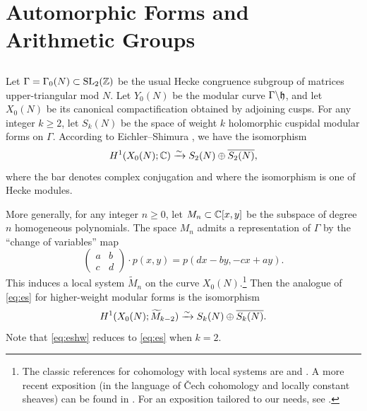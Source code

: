 \section{Automorphic Forms and Arithmetic Groups}\label{aut.forms}
%
\subsection{}
%
Let $\Gamma = \Gamma_{0} (N)\subset \operatorname{SL}_{2} (\mathbb{Z})$ be the usual Hecke
congruence subgroup of matrices upper-triangular mod $N$. Let
$Y_{0} (N)$ be the modular curve $\Gamma \backslash \mathfrak h$, and let
$X_{0} (N)$ be its canonical compactification obtained by adjoining
cusps.  For any integer $k\geq 2$, let $S_{k} (N)$ be the space of
weight $k$ holomorphic cuspidal modular forms on $\Gamma$.  According
to Eichler--Shimura \cite[Chapter 8]{shimura:intro}, we have the isomorphism
\begin{equation}\label{eq:es}
H^{1} (X_{0} (N); \mathbb{C})\xrightarrow{\sim} S_{2} (N)\oplus \overline{S_{2} (N)},
\end{equation} 
where the bar denotes complex conjugation and where the isomorphism
is one of Hecke modules. 

More generally, for any integer $n\geq 0$, let $M_{n}\subset \mathbb{C} [x,y]$
be the subspace of degree $n$ homogeneous polynomials.  The space
$M_{n}$ admits a representation of $\Gamma $ by the ``change of
variables'' map
\begin{equation}\label{eq:rep}
\left(\begin{array}{cc}
a&b\\
c&d
\end{array} \right)\cdot p (x,y) = p (dx-by, -cx+ay).
\end{equation}
This induces a local system $\widetilde{M}_{n}$ on the curve $X_{0}
(N)$.\footnote{The classic references for cohomology with local
systems are \cite[Section~31]{steenrod} and \cite[Ch. V]{eilenberg}.  A more
recent exposition (in the language of \v Cech cohomology and locally
constant sheaves) can be found in \cite[II.13]{bott.tu}.  For an
exposition tailored to our needs, 
see \cite[Section~2.9]{harder.notes}.}  Then the
analogue of \eqref{eq:es} for higher-weight modular forms is the
isomorphism
\begin{equation}\label{eq:eshw}
H^{1} (X_{0} (N); \widetilde{M}_{k-2})\xrightarrow{\sim} S_{k} (N)\oplus
\overline{S_{k} (N)}.  
\end{equation}
Note that \eqref{eq:eshw} reduces to \eqref{eq:es} when $k=2$.

